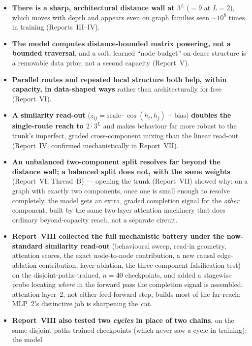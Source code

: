 \documentclass[11pt,a4paper]{article}
\begin{document}
\begin{itemize}\setlength\itemsep{0.2em}
  \item \textbf{There is a sharp, architectural distance wall at $3^L$} ($=9$ at $L=2$),
        which moves with depth and appears even on graph families seen $\sim10^8$ times in
        training (Reports~III--IV).
  \item \textbf{The model computes distance-bounded matrix powering, not a bounded
        traversal}, and a soft, learned ``node budget'' on dense structure is a removable
        data prior, not a second capacity (Report~V).
  \item \textbf{Parallel routes and repeated local structure both help, within capacity, in
        data-shaped ways} rather than architecturally for free (Report~VI).
  \item \textbf{A similarity read-out} ($z_{ij}=\mathrm{scale}\cdot\cos(h_i,h_j)+\mathrm{bias}$)
        \textbf{doubles the single-route reach to $2\cdot 3^L$} and makes behaviour far more
        robust to the trunk's imperfect, graded cross-component mixing than the linear
        read-out (Report~IV, confirmed mechanistically in Report~VII).
  \item \textbf{An unbalanced two-component split resolves far beyond the distance wall; a
        balanced split does not, with the same weights} (Report~VI, Thread~B) --- opening the
        trunk (Report~VII) showed why: on a graph with exactly two components, once one is
        small enough to resolve completely, the model gets an extra, graded completion signal
        for the \emph{other} component, built by the same two-layer attention machinery that
        does ordinary beyond-capacity reach, not a separate circuit.
  \item \textbf{Report~VIII collected the full mechanistic battery under the now-standard
        similarity read-out} (behavioural sweep, read-in geometry, attention scores, the exact
        node-to-node contribution, a new causal edge-ablation contribution, layer ablation,
        the three-component falsification test) on the disjoint-paths-trained, $n{=}40$
        checkpoints, and added a stagewise probe locating \emph{where} in the forward pass the
        completion signal is assembled: attention layer~2, not either feed-forward step,
        builds most of the far-reach; MLP~2's distinctive job is sharpening the \emph{cut}.
  \item \textbf{Report~VIII also tested two \emph{cycles} in place of two chains}, on the same
        disjoint-paths-trained checkpoints (which never saw a cycle in training): the model

\end{itemize}
\end{document}
